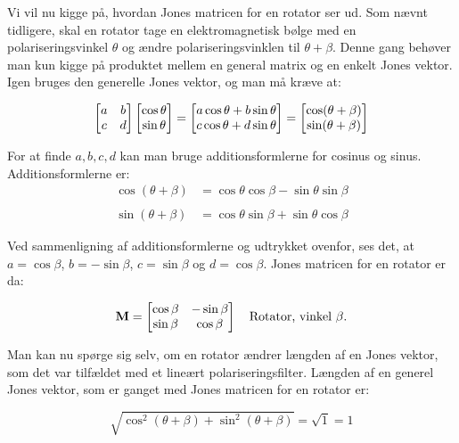 Vi vil nu kigge på, hvordan Jones matricen for en rotator ser ud. Som nævnt tidligere, skal en rotator tage en elektromagnetisk bølge med en polariseringsvinkel $\theta$ og ændre polariseringsvinklen til $\theta + \beta$. Denne gang behøver man kun kigge på produktet mellem en general matrix og en enkelt Jones vektor. Igen bruges den generelle Jones vektor, og man må kræve at:

$$\begin{bmatrix} a & b \\ c & d \\ \end{bmatrix} \begin{bmatrix} \cos \theta \\ \sin \theta \end{bmatrix} = \begin{bmatrix} a \cos \theta + b \sin \theta \\ c \cos \theta + d \sin \theta \end{bmatrix} = \begin{bmatrix} \cos (\theta + \beta) \\ \sin (\theta + \beta) \end{bmatrix}$$

\vspace{2mm}

For at finde $a,b,c,d$ kan man bruge additionsformlerne for cosinus og sinus. Additionsformlerne er:
\begin{align*}
\cos (\theta + \beta) &= \cos \theta \cos \beta - \sin \theta \sin \beta\\
\\
\sin (\theta + \beta) &= \cos \theta \sin \beta + \sin \theta \cos \beta
\end{align*}

\vspace{2mm}

Ved sammenligning af additionsformlerne og udtrykket ovenfor, ses det, at $a = \cos \beta$, $b = - \sin \beta$, $c = \sin \beta$ og $d = \cos \beta$. Jones matricen for en rotator er da:

\begin{equation}
\mathbf{M} = 
\begin{bmatrix}
\cos \beta & - \sin \beta \\
\sin \beta & \cos \beta \\
\end{bmatrix}
\quad \text{Rotator, vinkel $\beta$.} 
\end{equation}

Man kan nu spørge sig selv, om en rotator ændrer længden af en Jones vektor, som det var tilfældet med et lineært polariseringsfilter. Længden af en generel Jones vektor, som er ganget med Jones matricen for en rotator er:

$$\sqrt{\cos^2 (\theta + \beta) + \sin^2 (\theta + \beta)} = \sqrt{1} = 1$$

\vspace{2mm}

